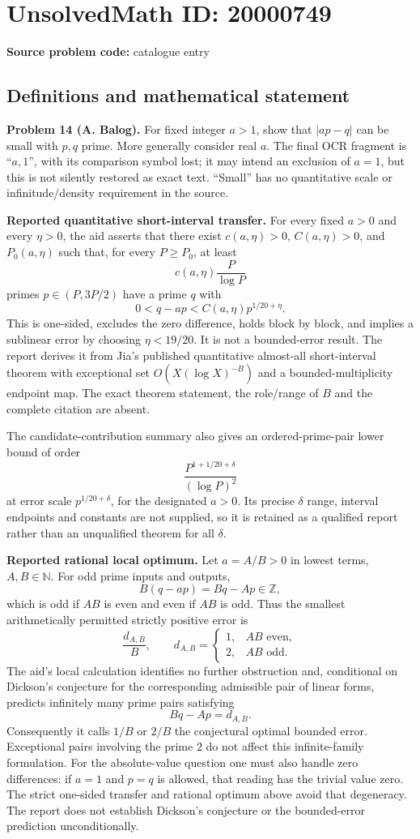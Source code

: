 \documentclass[11pt]{article}
\newcommand{\N}{\mathbb{N}}
\newcommand{\Z}{\mathbb{Z}}
\begin{document}
\section*{UnsolvedMath ID: 20000749}
\textbf{Source problem code:} catalogue entry
\subsection{Definitions and mathematical statement}
\textbf{Problem 14 (A. Balog).} For fixed integer $a>1$, show that $|ap-q|$ can be small with $p,q$ prime. More generally consider real $a$. The final OCR fragment is ``$a,1$'', with its comparison symbol lost; it may intend an exclusion of $a=1$, but this is not silently restored as exact text. ``Small'' has no quantitative scale or infinitude/density requirement in the source.

\textbf{Reported quantitative short-interval transfer.} For every fixed $a>0$ and every $\eta>0$, the aid asserts that there exist $c(a,\eta)>0$, $C(a,\eta)>0$, and $P_0(a,\eta)$ such that, for every $P\geq P_0$, at least
\[
 c(a,\eta)\frac P{\log P}
\]
primes $p\in(P,3P/2)$ have a prime $q$ with
\[
 0<q-ap<C(a,\eta)p^{1/20+\eta}.
\]
This is one-sided, excludes the zero difference, holds block by block, and implies a sublinear error by choosing $\eta<19/20$. It is not a bounded-error result. The report derives it from Jia's published quantitative almost-all short-interval theorem with exceptional set $O(X(\log X)^{-B})$ and a bounded-multiplicity endpoint map. The exact theorem statement, the role/range of $B$ and the complete citation are absent.

The candidate-contribution summary also gives an ordered-prime-pair lower bound of order
\[
 \frac{P^{1+1/20+\delta}}{(\log P)^2}
\]
at error scale $p^{1/20+\delta}$, for the designated $a>0$. Its precise $\delta$ range, interval endpoints and constants are not supplied, so it is retained as a qualified report rather than an unqualified theorem for all $\delta$.

\textbf{Reported rational local optimum.} Let $a=A/B>0$ in lowest terms, $A,B\in\N$. For odd prime inputs and outputs,
\[
 B(q-ap)=Bq-Ap\in\Z,
\]
which is odd if $AB$ is even and even if $AB$ is odd. Thus the smallest arithmetically permitted strictly positive error is
\[
 \frac{d_{A,B}}B,\qquad
 d_{A,B}=\begin{cases}1,&AB\text{ even},\\2,&AB\text{ odd}.\end{cases}
\]
The aid's local calculation identifies no further obstruction and, conditional on Dickson's conjecture for the corresponding admissible pair of linear forms, predicts infinitely many prime pairs satisfying
\[
 Bq-Ap=d_{A,B}.
\]
Consequently it calls $1/B$ or $2/B$ the conjectural optimal bounded error. Exceptional pairs involving the prime $2$ do not affect this infinite-family formulation. For the absolute-value question one must also handle zero differences: if $a=1$ and $p=q$ is allowed, that reading has the trivial value zero. The strict one-sided transfer and rational optimum above avoid that degeneracy. The report does not establish Dickson's conjecture or the bounded-error prediction unconditionally.
\end{document}
